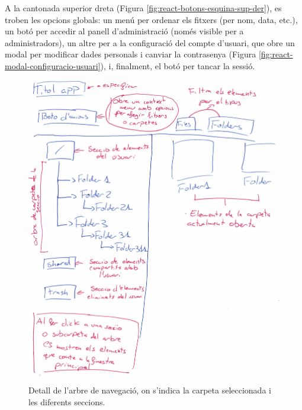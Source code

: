A la cantonada superior dreta (Figura \ref{fig:react-botons-esquina-sup-der}), es troben les opcions globals: un menú per ordenar els fitxers (per nom, data, etc.), un botó per accedir al panell d'administració (només visible per a administradors), un altre per a la configuració del compte d'usuari, que obre un modal per modificar dades personals i canviar la contrasenya (Figura \ref{fig:react-modal-configuracio-usuari}), i, finalment, el botó per tancar la sessió.

\begin{figure}[H]
    \centering
    \includegraphics[width=\textwidth]{Figures/interficies/react-arbre-carpetes.jpg}
    \caption{Detall de l'arbre de navegació, on s'indica la carpeta seleccionada i les diferents seccions.}
    \label{fig:react-arbre-carpetes}
\end{figure}

